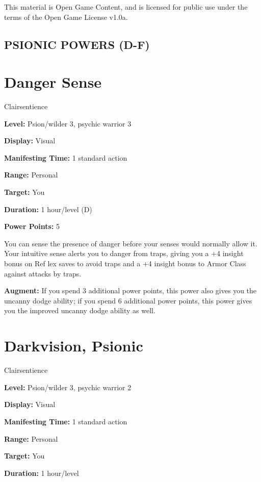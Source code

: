 \documentclass{article}
\begin{document}
This material is Open Game Content, and is licensed for public use under the terms 
of the Open Game License v1.0a.

\subsection*{{\LARGE{}PSIONIC POWERS (D-F)}}

\vspace{12pt}
\section*{Danger Sense}

Clairsentience

\textbf{Level:} Psion/wilder 3, psychic warrior 3

\textbf{Display:} Visual

\textbf{Manifesting Time:} 1 standard action

\textbf{Range:} Personal

\textbf{Target:} You

\textbf{Duration:} 1 hour/level (D)

\textbf{Power Points:} 5

You can sense the presence of danger before your senses would normally allow it. 
Your intuitive sense alerts you to danger from traps, giving you a +4 insight bonus 
on Ref lex saves to avoid traps and a +4 insight bonus to Armor Class against attacks 
by traps.

\textbf{Augment:} If you spend 3 additional power points, this power also gives 
you the uncanny dodge ability; if you spend 6 additional power points, this power 
gives you the improved uncanny dodge ability as well.

\vspace{12pt}
\section*{Darkvision, Psionic}

Clairsentience

\textbf{Level:} Psion/wilder 3, psychic warrior 2

\textbf{Display:} Visual

\textbf{Manifesting Time:} 1 standard action

\textbf{Range:} Personal

\textbf{Target:} You

\textbf{Duration:} 1 hour/level
\end{document}
